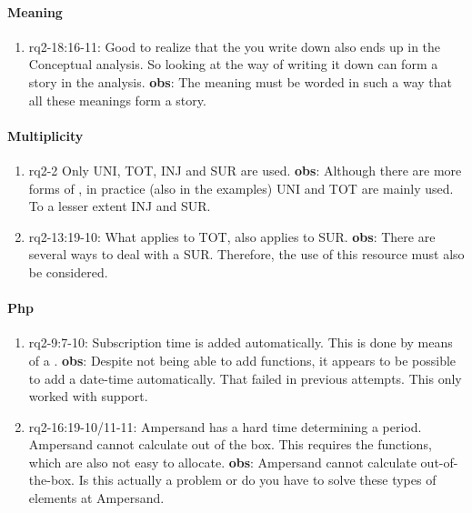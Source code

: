 \paragraph{Meaning}
\begin{enumerate}
    \item rq2-18:16-11: Good to realize that the  you write down also ends up in the {Conceptual analysis}.
    So looking at the way of writing it down can form a story in the analysis.
    \newline\textbf{obs}: The meaning must be worded in such a way that all these meanings form a story.

\end{enumerate}

\paragraph{Multiplicity}
\begin{enumerate}
    \item rq2-2 Only UNI, TOT, INJ and SUR are used.
    \newline\textbf{obs}: Although there are more forms of , in practice (also in the examples) UNI and TOT are mainly used.
    To a lesser extent INJ and SUR.

    \item rq2-13:19-10: What applies to  TOT, also applies to SUR. 
    \newline\textbf{obs}: There are several ways to deal with a SUR.
    Therefore, the use of this resource must also be considered.

\end{enumerate}

\paragraph{Php}
\begin{enumerate}
    \item rq2-9:7-10: Subscription time is added automatically.
    This is done by means of a .
    \newline\textbf{obs}: Despite not being able to add  functions, it appears to be possible to add a date-time automatically.
    That failed in previous attempts.
    This only worked with support.

    \item rq2-16:19-10/11-11: Ampersand has a hard time determining a period.
    Ampersand cannot calculate out of the box.
    This requires the  functions, which are also not easy to allocate.
    \newline\textbf{obs}: Ampersand cannot calculate out-of-the-box.
    Is this actually a problem or do you have to solve these types of elements at Ampersand.

\end{enumerate}

